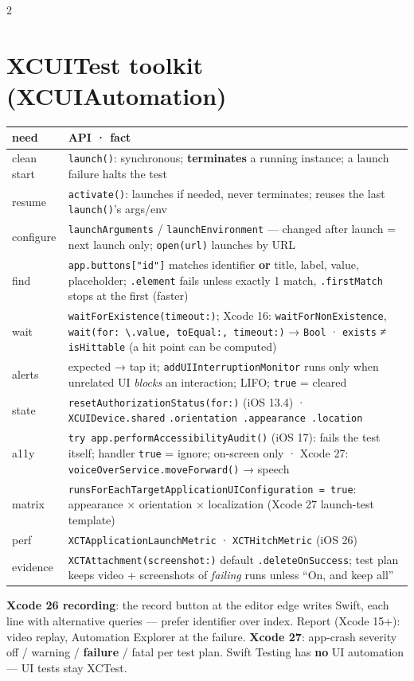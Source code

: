 \documentclass[8pt]{extarticle}
\newcommand\ct[1]{\texttt{#1}}
\begin{document}
\begin{multicols}{2}
\columnbreak

\section{XCUITest toolkit (XCUIAutomation)}
{\scriptsize\setlength{\tabcolsep}{2pt}
\begin{tabular}{@{}>{\raggedright\arraybackslash}p{13mm}>{\raggedright\arraybackslash}p{60mm}@{}}
\toprule
\textbf{need} & \textbf{API · fact}\\
\midrule
clean start & \ct{launch()}: synchronous; \textbf{terminates} a running instance; a launch failure halts the test\\
resume & \ct{activate()}: launches if needed, never terminates; reuses the last \ct{launch()}'s args/env\\
configure & \ct{launchArguments} / \ct{launchEnvironment} — changed after launch = next launch only; \ct{open(url)} launches by URL\\
find & \ct{app.buttons["id"]} matches identifier \textbf{or} title, label, value, placeholder; \ct{.element} fails unless exactly 1 match, \ct{.firstMatch} stops at the first (faster)\\
wait & \ct{waitForExistence(timeout:)}; Xcode 16: \ct{waitForNonExistence}, \ct{wait(for: \textbackslash.value, toEqual:, timeout:)} → \ct{Bool} · \ct{exists} ≠ \ct{isHittable} (a hit point can be computed)\\
alerts & expected → tap it; \ct{addUIInterruptionMonitor} runs only when unrelated UI \emph{blocks} an interaction; LIFO; \ct{true} = cleared\\
state & \ct{resetAuthorizationStatus(for:)} (iOS 13.4) · \ct{XCUIDevice.shared} \ct{.orientation .appearance .location}\\
a11y & \ct{try app.performAccessibilityAudit()} (iOS 17): fails the test itself; handler \ct{true} = ignore; on-screen only · Xcode 27: \ct{voiceOverService.moveForward()} → speech\\
matrix & \ct{runsForEachTargetApplicationUIConfiguration = true}: appearance × orientation × localization (Xcode 27 launch-test template)\\
perf & \ct{XCTApplicationLaunchMetric} · \ct{XCTHitchMetric} (iOS 26)\\
evidence & \ct{XCTAttachment(screenshot:)} default \ct{.deleteOnSuccess}; test plan keeps video + screenshots of \emph{failing} runs unless ``On, and keep all''\\
\bottomrule
\end{tabular}}\par
\textbf{Xcode 26 recording}: the record button at the editor edge writes Swift, each line with
alternative queries — prefer identifier over index. Report (Xcode 15+): video replay, Automation
Explorer at the failure. \textbf{Xcode 27}: app-crash severity off / warning / \textbf{failure} /
fatal per test plan. Swift Testing has \textbf{no} UI automation — UI tests stay XCTest.


\end{multicols}
\end{document}
